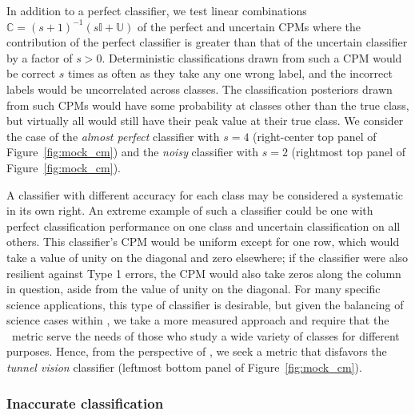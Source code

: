 In addition to a perfect classifier, we test linear combinations $\mathbb{C} = (s + 1)^{-1} \left(s\mathbb{I} + \mathbb{U}\right)$ of the perfect and uncertain CPMs where the contribution of the perfect classifier is greater than that of the uncertain classifier by a factor of $s > 0$.
Deterministic classifications drawn from such a CPM would be correct $s$ times as often as they take any one wrong label, and the incorrect labels would be uncorrelated across classes.
The classification posteriors drawn from such CPMs would have some probability at classes other than the true class, but virtually all would still have their peak value at their true class.
We consider the case of the \textit{almost perfect} classifier with $s=4$ (right-center top panel of Figure~\ref{fig:mock_cm}) and the \textit{noisy} classifier with $s=2$ (rightmost top panel of Figure~\ref{fig:mock_cm}).

A classifier with different accuracy for each class may be considered a systematic in its own right.
An extreme example of such a classifier could be one with perfect classification performance on one class and uncertain classification on all others.
This classifier's CPM would be uniform except for one row, which would take a value of unity on the diagonal and zero elsewhere; if the classifier were also resilient against Type 1 errors, the CPM would also take zeros along the column in question, aside from the value of unity on the diagonal.
For many specific science applications, this type of classifier is desirable, but given the balancing of science cases within \lsst, we take a more measured approach and require that the \plasticc\ metric serve the needs of those who study a wide variety of classes for different purposes.
Hence, from the perspective of \plasticc, we seek a metric that disfavors the \textit{tunnel vision} classifier (leftmost bottom panel of Figure~\ref{fig:mock_cm}).

\subsubsection{Inaccurate classification}
\label{sec:inaccuratedata}

